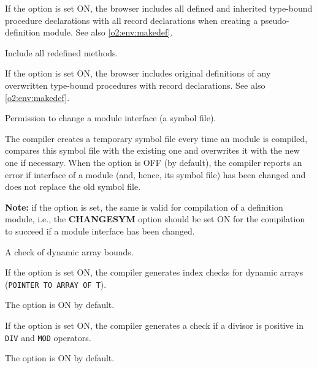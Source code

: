 \begin{description}
        If the option is set ON, the browser includes all
        defined and inherited type-bound procedure
        declarations with all record declarations when creating
        a pseudo-definition   module.  See also
        \ref{o2:env:makedef}.

        \MLBegin{}\ModeB{}\MLEnd{}

\nopagebreak
        Include all redefined methods.

        If the option is set ON, the browser includes original
        definitions of any overwritten type-bound  procedures  with
        record declarations.
        See also \ref{o2:env:makedef}.

        \MLBegin{}\ModeC{}\MLEnd{} \header

        Permission to change a module interface (a symbol file).

        The \ot{} compiler creates a temporary symbol file
        every time an \ot{} module is compiled,
        compares this symbol file with the existing one and
        overwrites it with the new one if necessary. When
        the  option is OFF (by default), the compiler
        reports an error if interface of a module
        (and, hence, its symbol file) has been changed and does
        not replace the old symbol file.

        {\bf  Note:}  if  the  option is set, the
        same  is valid for compilation  of a \mt{}
        definition  module,  i.e.,  the {\bf CHANGESYM} option
        should be set ON for the compilation to succeed
        if a module interface has been changed.

        \MLBegin{}\ModeC{}\MLEnd{} \inline

        A check of dynamic array bounds.

        If the option is set ON, the compiler generates index checks
        for dynamic arrays (\verb'POINTER TO ARRAY OF T').

        The option is ON by default.


        \MLBegin{}\ModeC{}\MLEnd{} \inline

        If the option is set ON, the compiler generates a check if
        a divisor is positive in \verb'DIV' and \verb'MOD' operators.

        The option is ON by default.



\end{description}
